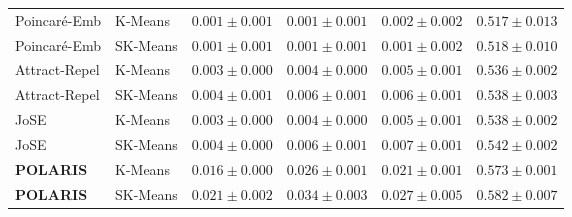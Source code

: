 \documentclass[journal]{IEEEtran}
\begin{document}
\begin{table}[!t]
{\begin{tabular}{llcccc}
Poincar\'{e}-Emb & K-Means & $0.001 \pm 0.001$ & $0.001 \pm 0.001$ & $0.002 \pm 0.002$ & $0.517 \pm 0.013$ \\
Poincar\'{e}-Emb & SK-Means & $0.001 \pm 0.001$ & $0.001 \pm 0.001$ & $0.001 \pm 0.002$ & $0.518 \pm 0.010$ \\
Attract-Repel & K-Means & $0.003 \pm 0.000$ & $0.004 \pm 0.000$ & $0.005 \pm 0.001$ & $0.536 \pm 0.002$ \\
Attract-Repel & SK-Means & $0.004 \pm 0.001$ & $0.006 \pm 0.001$ & $0.006 \pm 0.001$ & $0.538 \pm 0.003$ \\
JoSE & K-Means & $0.003 \pm 0.000$ & $0.004 \pm 0.000$ & $0.005 \pm 0.001$ & $0.538 \pm 0.002$ \\
JoSE & SK-Means & $0.004 \pm 0.000$ & $0.006 \pm 0.001$ & $0.007 \pm 0.001$ & $0.542 \pm 0.002$ \\
\textbf{POLARIS} & K-Means & $0.016 \pm 0.000$ & $0.026 \pm 0.001$ & $0.021 \pm 0.001$ & $0.573 \pm 0.001$ \\
\textbf{POLARIS} & SK-Means & $\mathbf{0.021 \pm 0.002}$ & $\mathbf{0.034 \pm 0.003}$ & $\mathbf{0.027 \pm 0.005}$ & $\mathbf{0.582 \pm 0.007}$ \\
\bottomrule
\end{tabular}%
}
\end{table}

\begin{table}[!t]
\centering
\caption{Experiment 3 (Panel C): Anchor-Guided Zero-Shot Polarity Projection Along Antipodal Axis $\mathbf{p}_{\text{bip}} \in \mathbb{S}^{99}$ on Rotten Tomatoes Across All 3 Canonical Anchor Sets (10 Seeds, Mean $\pm$ SD, Tesla T4).}
\label{tab:exp3_polarity_proj}
\end{table}
\end{document}
